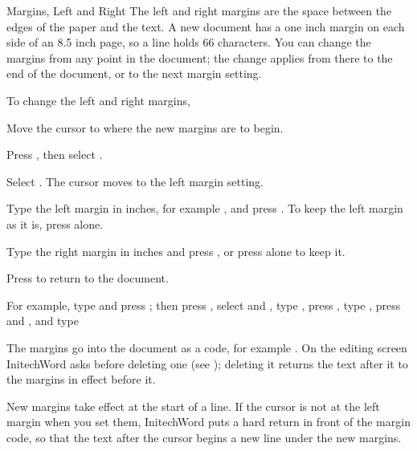 \begin{Feature}{Margins, Left and Right}
The left and right margins are the space between the edges of the paper
and the text.  A new document has a one inch margin on each side of an 8.5
inch page, so a line holds 66 characters.  You can change the margins from
any point in the document; the change applies from there to the end of the
document, or to the next margin setting.

To change the left and right margins,
\begin{WPSteps}
\item Move the cursor to where the new margins are to begin.
\item Press , then select .
\item Select .  The cursor moves to the left margin setting.
\item Type the left margin in inches, for example , and press
.  To keep the left margin as it is, press  alone.
\item Type the right margin in inches and press , or press
 alone to keep it.
\item Press  to return to the document.
\end{WPSteps}

For example, type  and press ;
then press , select  and
, type , press , type
, press  and , and type
\EndReplay

\Notes
{}
The margins go into the document as a 
code, for example \Code{[L/R Mar:1.5",2"]}.  On the editing screen
InitechWord asks before deleting one (see ); deleting it
returns the text after it to the margins in effect before it.

New margins take effect at the start of a line.  If the cursor is not at the
left margin when you set them, InitechWord puts a hard return in front of
the margin code, so that the text after the cursor begins a new line under
the new margins.


\end{Feature}
